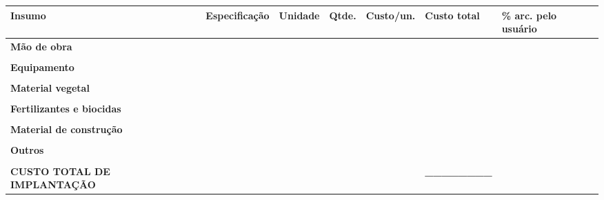 {
\begin{longtable}[]{@{}
  >{\raggedright\arraybackslash}p{}
  >{\raggedright\arraybackslash}p{}
  >{\raggedright\arraybackslash}p{}
  >{\raggedleft\arraybackslash}p{}
  >{\raggedleft\arraybackslash}p{}
  >{\raggedleft\arraybackslash}p{}
  >{\centering\arraybackslash}p{}@{}}
\toprule\noalign{}
\begin{minipage}[b]{\linewidth}\raggedright
Insumo
\end{minipage} & \begin{minipage}[b]{\linewidth}\raggedright
Especificação
\end{minipage} & \begin{minipage}[b]{\linewidth}\raggedright
Unidade
\end{minipage} & \begin{minipage}[b]{\linewidth}\raggedleft
Qtde.
\end{minipage} & \begin{minipage}[b]{\linewidth}\raggedleft
Custo/un.
\end{minipage} & \begin{minipage}[b]{\linewidth}\raggedleft
Custo total
\end{minipage} & \begin{minipage}[b]{\linewidth}\centering
\% arc. pelo usuário
\end{minipage} \\
\midrule\noalign{}
\endhead
\bottomrule\noalign{}
\endlastfoot
\textbf{Mão de obra} & & & & & & \\
& & & & & & \\
\textbf{Equipamento} & & & & & & \\
& & & & & & \\
\textbf{Material vegetal} & & & & & & \\
& & & & & & \\
\textbf{Fertilizantes e biocidas} & & & & & & \\
& & & & & & \\
\textbf{Material de construção} & & & & & & \\
& & & & & & \\
\textbf{Outros} & & & & & & \\
& & & & & & \\
\textbf{CUSTO TOTAL DE IMPLANTAÇÃO} & & & & & \textbf{\_\_\_\_\_\_\_\_} & \\
\end{longtable}
}

